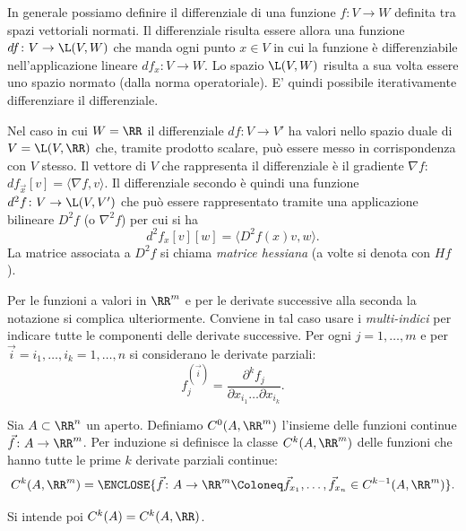 In generale possiamo definire il differenziale di una funzione 
$f\colon V\to W$
definita tra spazi vettoriali normati.
Il differenziale risulta essere allora 
una funzione $df\colon V \to \L(V,W)$ che manda 
ogni punto $x\in V$ in cui la funzione è differenziabile
nell'applicazione lineare $df_x\colon V\to W$.
Lo spazio $\L(V,W)$ risulta a sua volta essere uno spazio normato
(dalla norma operatoriale). 
E' quindi possibile iterativamente differenziare il differenziale.

Nel caso in cui $W=\RR$ il differenziale 
$df\colon V \to V'$ ha valori nello spazio duale di $V = \L(V,\RR)$
che, tramite prodotto scalare,
può essere messo in corrispondenza con $V$ stesso. 
Il vettore di $V$ che rappresenta il differenziale è il gradiente $\nabla f$:
$df_{\vec x}[v] = \langle \nabla f, v\rangle$.
Il differenziale secondo è quindi una funzione $d^2 f\colon V\to \L(V,V')$ 
che può essere rappresentato tramite una applicazione bilineare 
$D^2 f$ (o $\nabla^2 f$) per cui si ha
\[
   d^2 f_x[v][w] = \langle D^2 f(x) v, w\rangle.
\]
La matrice associata a $D^2 f$ si chiama \emph{matrice hessiana}
(a volte si denota con $Hf$). 

Per le funzioni a valori in $\RR^m$ e per le derivate successive 
alla seconda la notazione si complica ulteriormente.
Conviene in tal caso usare i \emph{multi-indici} per indicare tutte le 
componenti delle derivate successive. 
Per ogni $j=1,\dots,m$ e per $\vec i = i_1,\dots, i_k = 1,\dots, n$ 
si considerano le derivate parziali:
\[
    f^{(\vec i)}_j = \frac{\partial^k f_j}{\partial x_{i_1} \dots \partial x_{i_k}}.
\] 

\begin{definition}
Sia $A\subset \RR^n$ un aperto. 
Definiamo $C^0(A,\RR^m)$ l'insieme delle funzioni continue
$\vec f\colon A \to \RR^m$. 
Per induzione si definisce la classe $C^k(A,\RR^m)$ 
delle funzioni che hanno tutte le prime $k$ derivate parziali 
continue:
\[
   C^k(A,\RR^m) = \ENCLOSE{\vec f\colon A\to\RR^m\Coloneq
     \vec f_{x_1}, \dots, \vec f_{x_n} \in C^{k-1}(A,\RR^m)
   }.
\]

Si intende poi $C^k(A) = C^k(A,\RR)$.
\end{definition}

